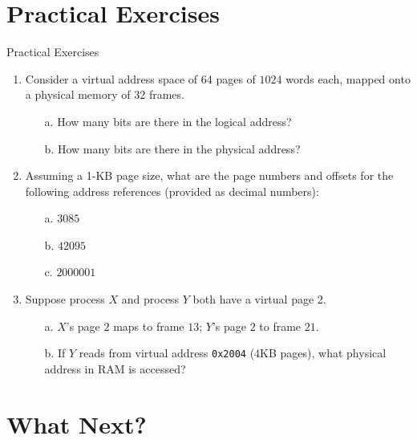 \documentclass[11pt, table, aspectratio=169]{beamer}
\begin{document}
\section{\textbf{Practical Exercises}}
\begin{frame}{Practical Exercises}
	\begin{enumerate}
		\item Consider a virtual address space of $64$ pages of $1024$ words each, mapped onto a physical memory of $32$ frames.
		\begin{enumerate}
			\item [a. ] How many bits are there in the logical address? 
			\item[b. ] How many bits are there in the physical address?
		\end{enumerate}
		\item Assuming a 1-KB page size, what are the page numbers and offsets for the following address references (provided as decimal numbers): 
		\begin{enumerate}
			\item[a. ] $3085$
			\item[b. ] $42095$
			\item [c. ] $2000001$
		\end{enumerate}
		
		\item Suppose process $X$ and process $Y$ both have a virtual page 2.
		\begin{itemize}
			\item [a. ] $X$'s page $2$ maps to frame $13$; $Y$'s page $2$ to frame $21$.
			\item [b.] If $Y$ reads from virtual address \texttt{0x2004} (4KB pages), what physical address in RAM is accessed?
		\end{itemize}
	\end{enumerate}
	
	
\end{frame}

\section{\textbf{What Next?}}
	
\end{document}
